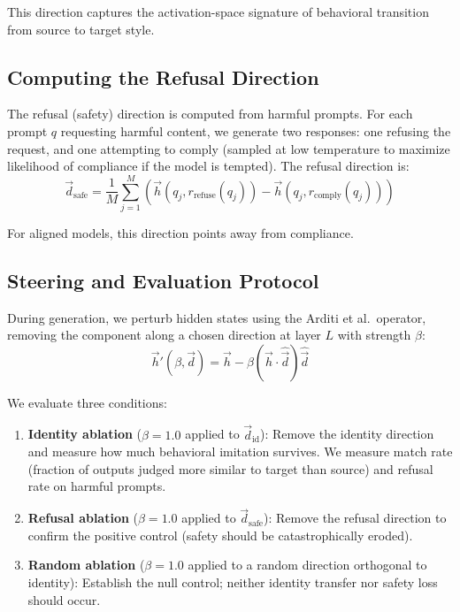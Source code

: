 \documentclass[letterpaper,twocolumn]{article}
\begin{document}
This direction captures the activation-space signature of behavioral transition from source to target style.

\subsection{Computing the Refusal Direction}

The refusal (safety) direction is computed from harmful prompts. For each prompt $q$ requesting harmful content, we generate two responses: one refusing the request, and one attempting to comply (sampled at low temperature to maximize likelihood of compliance if the model is tempted). The refusal direction is:
\[
\vec{d}_{\text{safe}} = \frac{1}{M} \sum_{j=1}^{M} (\vec{h}(q_j, r_{\text{refuse}}(q_j)) - \vec{h}(q_j, r_{\text{comply}}(q_j)))
\]

For aligned models, this direction points away from compliance.

\subsection{Steering and Evaluation Protocol}

During generation, we perturb hidden states using the Arditi et al.\ operator, removing the component along a chosen direction at layer $L$ with strength $\beta$:
\[
\vec{h}'(\beta, \vec{d}) = \vec{h} - \beta (\vec{h} \cdot \hat{\vec{d}}) \hat{\vec{d}}
\]

We evaluate three conditions:

\begin{enumerate}
\item[(a)] \textbf{Identity ablation} ($\beta=1.0$ applied to $\vec{d}_{\text{id}}$): Remove the identity direction and measure how much behavioral imitation survives. We measure match rate (fraction of outputs judged more similar to target than source) and refusal rate on harmful prompts.

\item[(b)] \textbf{Refusal ablation} ($\beta=1.0$ applied to $\vec{d}_{\text{safe}}$): Remove the refusal direction to confirm the positive control (safety should be catastrophically eroded).

\item[(c)] \textbf{Random ablation} ($\beta=1.0$ applied to a random direction orthogonal to identity): Establish the null control; neither identity transfer nor safety loss should occur.

\end{enumerate}
\end{document}
